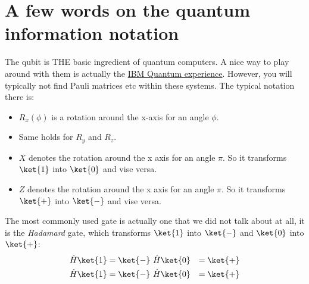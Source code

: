 \section{A few words on the quantum information notation}

The qubit is THE basic ingredient of quantum computers. A nice way to play around with them is actually the \href{https://quantum-computing.ibm.com/}{IBM Quantum experience}. However, you will typically not find Pauli matrices etc within these systems. The typical notation there is:
\begin{itemize}
\item $R_x(\phi)$ is a rotation around the x-axis for an angle $\phi$.
\item Same holds for $R_y$ and $R_z$.
\item $X$ denotes the rotation around the x axis for an angle $\pi$. So it transforms $\ket{1}$ into  $\ket{0}$ and vise versa.
\item $Z$ denotes the rotation around the x axis for an angle $\pi$. So it transforms $\ket{+}$ into  $\ket{-}$ and vise versa.
\end{itemize}
The most commonly used gate is actually one that we did not talk about at all, it is the \textit{Hadamard} gate, which transforms $\ket{1}$ into  $\ket{-}$ and $\ket{0}$ into  $\ket{+}$:
\begin{align}
\hat{H}\ket{1} &= \ket{-}  ~   \hat{H}\ket{0} &= \ket{+}\\
\hat{H}\ket{1} &= \ket{-}  ~   \hat{H}\ket{0} &= \ket{+}\\
\end{align}
